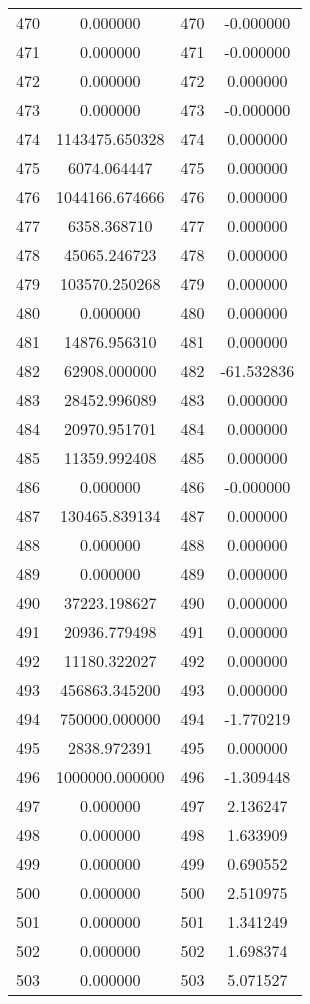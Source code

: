 \documentclass[12pt]{article}
\begin{document}
\begin{longtable}{@{}cccc@{}}
470 & 0.000000 & 470 & -0.000000 \\
471 & 0.000000 & 471 & -0.000000 \\
472 & 0.000000 & 472 & 0.000000 \\
473 & 0.000000 & 473 & -0.000000 \\
474 & 1143475.650328 & 474 & 0.000000 \\
475 & 6074.064447 & 475 & 0.000000 \\
476 & 1044166.674666 & 476 & 0.000000 \\
477 & 6358.368710 & 477 & 0.000000 \\
478 & 45065.246723 & 478 & 0.000000 \\
479 & 103570.250268 & 479 & 0.000000 \\
480 & 0.000000 & 480 & 0.000000 \\
481 & 14876.956310 & 481 & 0.000000 \\
482 & 62908.000000 & 482 & -61.532836 \\
483 & 28452.996089 & 483 & 0.000000 \\
484 & 20970.951701 & 484 & 0.000000 \\
485 & 11359.992408 & 485 & 0.000000 \\
486 & 0.000000 & 486 & -0.000000 \\
487 & 130465.839134 & 487 & 0.000000 \\
488 & 0.000000 & 488 & 0.000000 \\
489 & 0.000000 & 489 & 0.000000 \\
490 & 37223.198627 & 490 & 0.000000 \\
491 & 20936.779498 & 491 & 0.000000 \\
492 & 11180.322027 & 492 & 0.000000 \\
493 & 456863.345200 & 493 & 0.000000 \\
494 & 750000.000000 & 494 & -1.770219 \\
495 & 2838.972391 & 495 & 0.000000 \\
496 & 1000000.000000 & 496 & -1.309448 \\
497 & 0.000000 & 497 & 2.136247 \\
498 & 0.000000 & 498 & 1.633909 \\
499 & 0.000000 & 499 & 0.690552 \\
500 & 0.000000 & 500 & 2.510975 \\
501 & 0.000000 & 501 & 1.341249 \\
502 & 0.000000 & 502 & 1.698374 \\
503 & 0.000000 & 503 & 5.071527 \\

\end{longtable}
\end{document}
